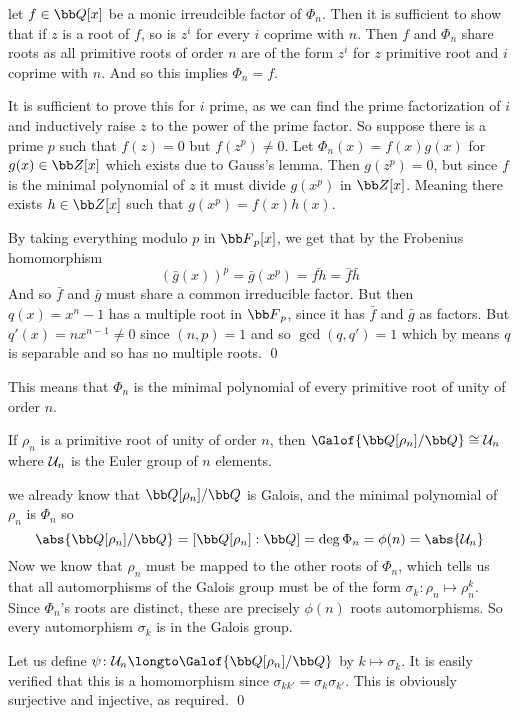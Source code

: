 \ethrm

\Proof let $f\in{\bb Q}[x]$ be a monic irreudcible factor of $\Phi_n$.
Then it is sufficient to show that if $z$ is a root of $f$, so is $z^i$ for every $i$ coprime with $n$.
Then $f$ and $\Phi_n$ share roots as all primitive roots of order $n$ are of the form $z^i$ for $z$ primitive root and $i$ coprime with $n$.
And so this implies $\Phi_n=f$.

It is sufficient to prove this for $i$ prime, as we can find the prime factorization of $i$ and inductively raise $z$ to the power of the prime factor.
So suppose there is a prime $p$ such that $f(z)=0$ but $f(z^p)\neq0$.
Let $\Phi_n(x)=f(x)g(x)$ for $g(x)\in{\bb Z}[x]$ which exists due to Gauss's lemma.
Then $g(z^p)=0$, but since $f$ is the minimal polynomial of $z$ it must divide $g(x^p)$ in ${\bb Z}[x]$.
Meaning there exists $h\in{\bb Z}[x]$ such that $g(x^p)=f(x)h(x)$.

By taking everything modulo $p$ in ${\bb F}_p[x]$, we get that by the Frobenius homomorphism
$$ (\bar g(x))^p = \bar g(x^p) = \overline{fh} = \bar f\bar h $$
And so $\bar f$ and $\bar g$ must share a common irreducible factor.
But then $q(x)=x^n-1$ has a multiple root in ${\bb F}_p$, since it has $\bar f$ and $\bar g$ as factors.
But $q'(x)=nx^{n-1}\neq0$ since $(n,p)=1$ and so $\gcd(q,q')=1$ which by  means $q$ is separable and so has no multiple roots.
\qed

This means that $\Phi_n$ is the minimal polynomial of every primitive root of unity of order $n$.

\bcoro

    If $\rho_n$ is a primitive root of unity of order $n$, then $\Galof{{\bb Q}[\rho_n]/{\bb Q}}\cong{\cal U}_n$ where ${\cal U}_n$ is the Euler group of $n$ elements.

\ecoro

\Proof we already know that ${\bb Q}[\rho_n]/{\bb Q}$ is Galois, and the minimal polynomial of $\rho_n$ is $\Phi_n$ so
$$ \abs{{\bb Q}[\rho_n]/{\bb Q}} = [{\bb Q}[\rho_n] : {\bb Q}] = \deg\Phi_n = \phi(n) = \abs{{\cal U}_n} $$
Now we know that $\rho_n$ must be mapped to the other roots of $\Phi_n$, which tells us that all automorphisms of the Galois group must be of the form $\sigma_k\colon\rho_n\mapsto\rho_n^k$.
Since $\Phi_n$'s roots are distinct, these are precisely $\phi(n)$ roots automorphisms.
So every automorphism $\sigma_k$ is in the Galois group.

Let us define $\psi\colon{\cal U}_n\longto\Galof{{\bb Q}[\rho_n]/{\bb Q}}$ by $k\mapsto\sigma_k$.
It is easily verified that this is a homomorphism since $\sigma_{kk'}=\sigma_k\sigma_{k'}$.
This is obviously surjective and injective, as required.
\qed

